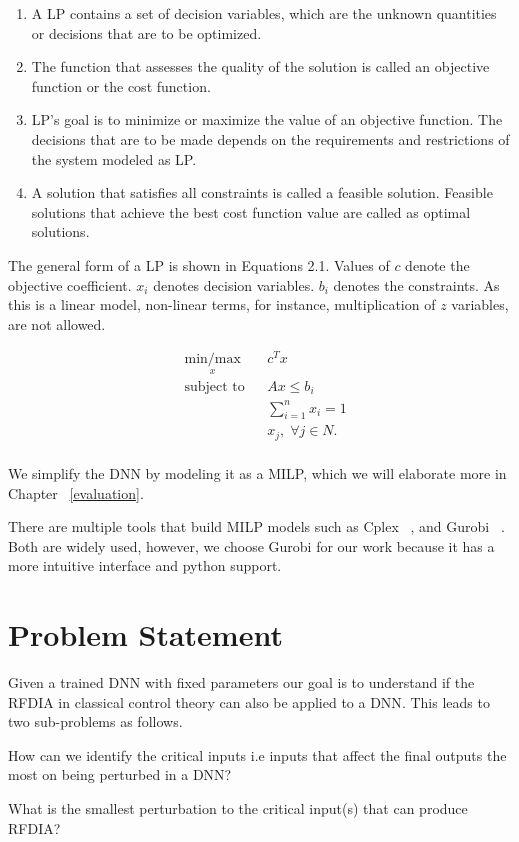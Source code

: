 \begin{enumerate}
	\item A \ac{LP} contains a set of decision variables, which are the unknown quantities or decisions that are to be optimized. 
	\item The function that assesses the quality of the solution is called an objective function or the cost function.
	\item \ac{LP}'s goal is to minimize or maximize the value of an objective function. 
	The decisions that are to be made depends on the requirements and restrictions of the  system modeled as \ac{LP}.
	\item A solution that satisfies all constraints is called a feasible solution. 
	Feasible solutions that achieve the best cost function value are called as optimal solutions. 
\end{enumerate}


The general form of a \ac{LP}  is shown in Equations 2.1. 
Values of $c$ denote the objective coefficient. 
$x_i$ denotes decision variables.
$b_i$ denotes the constraints.
As this is a linear model, non-linear terms, for instance, multiplication of $z$ variables, are not allowed. 

\begin{equation}
\begin{aligned}
& \underset{x}{\text{min/max}}
& & c^T x \\
& \text{subject to} & &  Ax \leq b_i \\
& & &  \sum_{i=1}^{n} x_i =1 \\
& & &  x_j, \; \forall j \in N. \\
\end{aligned}
\end{equation}


We simplify the \ac{DNN} by modeling it as a \ac{MILP}, which we will elaborate more in Chapter ~\ref{evaluation}.  

There are multiple tools that build \ac{MILP} models such as Cplex ~\cite{cplex}, and Gurobi ~\cite{gurobi}.
Both are widely used, however, we choose Gurobi for our work because it has a more intuitive interface and python support.



\section{Problem Statement}
\label{problemstatement}

Given a trained DNN with fixed parameters our goal is to understand if the  \ac*{RFDIA} in classical control theory can also be applied to a \ac{DNN}.
This leads to two sub-problems as follows.

\begin{problem}
	How can we identify the critical inputs i.e inputs that  affect the final outputs the most on being perturbed in a \ac{DNN}?
\end{problem}

\begin{problem}
	What is the smallest perturbation to the critical input(s) that can produce \ac{RFDIA}?
\end{problem}




